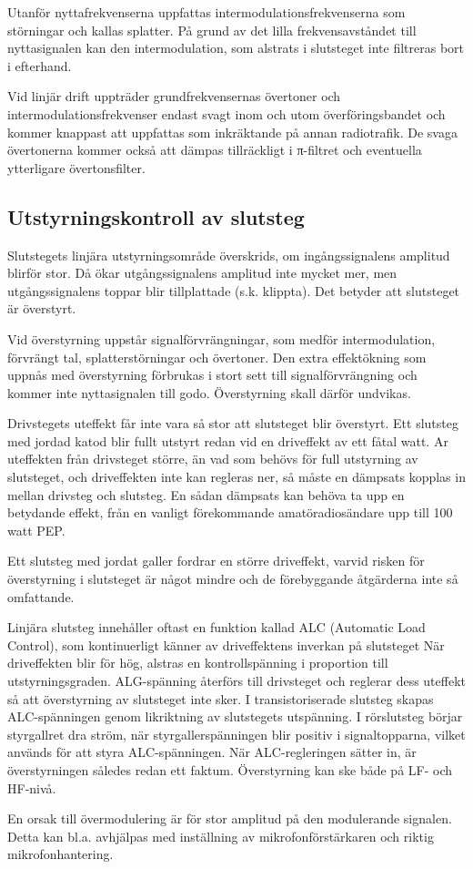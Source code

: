 Utanför nyttafrekvenserna uppfattas intermodulationsfrekvenserna som
störningar och kallas splatter. På grund av det lilla
frekvensavståndet till nyttasignalen kan den intermodulation, som
alstrats i slutsteget inte filtreras bort i efterhand.

Vid linjär drift uppträder grundfrekvensernas övertoner och
intermodulationsfrekvenser endast svagt inom och utom
överföringsbandet och kommer knappast att uppfattas som inkräktande på
annan radiotrafik.  De svaga övertonerna kommer också att dämpas
tillräckligt i π-filtret och eventuella ytterligare övertonsfilter.


\subsection{Utstyrningskontroll av slutsteg}

Slutstegets linjära utstyrningsområde överskrids, om ingångssignalens
amplitud blirför stor. Då ökar utgångssignalens amplitud inte mycket
mer, men utgångssignalens toppar blir tillplattade (s.k. klippta). Det
betyder att slutsteget är överstyrt.

Vid överstyrning uppstår signalförvrängningar, som medför
intermodulation, förvrängt tal, splatterstörningar och övertoner.  Den
extra effektökning som uppnås med överstyrning förbrukas i stort sett
till signalförvrängning och kommer inte nyttasignalen till
godo. Överstyrning skall därför undvikas.

Drivstegets uteffekt får inte vara så stor att slutsteget blir
överstyrt. Ett slutsteg med jordad katod blir fullt utstyrt redan vid
en driveffekt av ett fåtal watt. Ar uteffekten från drivsteget större,
än vad som behövs för full utstyrning av slutsteget, och driveffekten
inte kan regleras ner, så måste en dämpsats kopplas in mellan drivsteg
och slutsteg. En sådan dämpsats kan behöva ta upp en betydande effekt,
från en vanligt förekommande amatöradiosändare upp till 100 watt PEP.

Ett slutsteg med jordat galler fordrar en större driveffekt, varvid
risken för överstyrning i slutsteget är något mindre och de
förebyggande åtgärderna inte så omfattande.

Linjära slutsteg innehåller oftast en funktion kallad ALC (Automatic
Load Control), som kontinuerligt känner av driveffektens inverkan på
slutsteget När driveffekten blir för hög, alstras en kontrollspänning
i proportion till utstyrningsgraden. ALG-spänning återförs till
drivsteget och reglerar dess uteffekt så att överstyrning av
slutsteget inte sker. I transistoriserade slutsteg skapas
ALC-spänningen genom likriktning av slutstegets utspänning. I
rörslutsteg börjar styrgallret dra ström, när styrgallerspänningen
blir positiv i signaltopparna, vilket används för att styra
ALC-spänningen. När ALC-regleringen sätter in, är överstyrningen
således redan ett faktum. Överstyrning kan ske både på LF- och HF-nivå.

En orsak till övermodulering är för stor amplitud på den modulerande
signalen. Detta kan bl.a. avhjälpas med inställning av
mikrofonförstärkaren och riktig mikrofonhantering.
